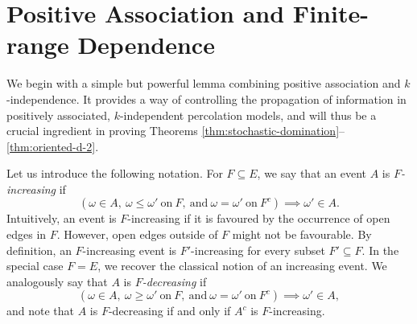 \documentclass[11pt]{article}
\theoremstyle{remark}
\begin{document}
\section{Positive Association and Finite-range Dependence}
\label{sec:stochastic-domination}

We begin with a simple but powerful lemma combining positive association and $k$-independence. It provides a way of controlling the propagation of information in positively associated, $k$-independent percolation models, and will thus be a crucial ingredient in proving Theorems \ref{thm:stochastic-domination}--\ref{thm:oriented-d-2}. 

Let us introduce the following notation. For $F \subseteq E$, we say that an event $A$ is \emph{$F$-increasing} if 
\begin{equation*}
	\left( \omega \in A, \ \omega \le \omega' \ \text{on} \ F, \ \text{and} \ \omega = \omega' \ \text{on} \ F^c \right) \implies \omega' \in A.
\end{equation*}
Intuitively, an event is $F$-increasing if it is favoured by the occurrence of open edges in $F$. However, open edges outside of $F$ might not be favourable. By definition, an $F$-increasing event is $F'$-increasing for every subset $F' \subseteq F$. In the special case $F=E$, we recover the classical notion of an increasing event.
We analogously say that $A$ is \emph{$F$-decreasing} if 
\begin{equation*}
	\left( \omega \in A, \ \omega \ge \omega' \ \text{on} \ F, \ \text{and} \ \omega = \omega' \ \text{on} \ F^c \right) \implies \omega' \in A,
\end{equation*}
and note that $A$ is $F$-decreasing if and only if $A^c$ is $F$-increasing.
\end{document}
